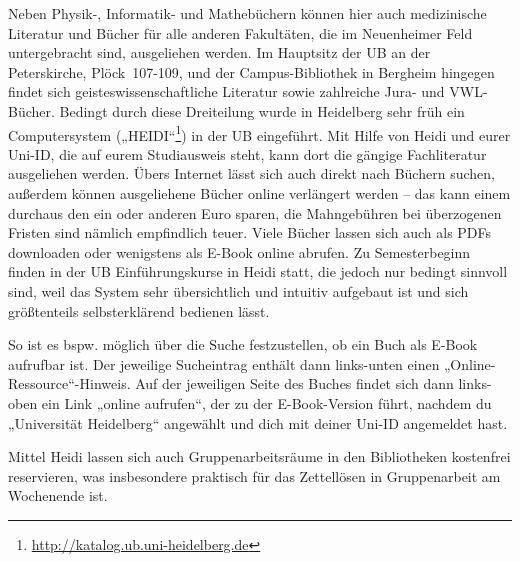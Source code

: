 Neben Physik-, Informatik- und Mathebüchern können hier auch medizinische Literatur und Bücher für alle anderen Fakultäten, die im Neuenheimer Feld untergebracht sind, ausgeliehen werden. Im Hauptsitz der \gls{UB} an der Peterskirche, Plöck~107-109, und der Campus-Bibliothek in Bergheim hingegen findet sich geisteswissenschaftliche Literatur sowie zahlreiche Jura- und VWL- Bücher. Bedingt durch diese Dreiteilung wurde in Heidelberg sehr früh ein Computersystem („\gls{HEIDI}“\footnote{\url{http://katalog.ub.uni-heidelberg.de}}) in der UB eingeführt. Mit Hilfe von Heidi und eurer Uni-ID, die auf eurem Studiausweis steht, kann dort die gängige Fachliteratur ausgeliehen werden. Übers Internet lässt sich auch direkt nach Büchern suchen, außerdem können ausgeliehene Bücher online verlängert werden -- das kann einem durchaus den ein oder anderen Euro sparen, die Mahngebühren bei überzogenen Fristen sind nämlich empfindlich teuer. Viele Bücher lassen sich auch als PDFs downloaden oder wenigstens als E-Book online abrufen. Zu Semesterbeginn finden in der UB Einführungskurse in Heidi statt, die jedoch nur bedingt sinnvoll sind, weil das System sehr übersichtlich und intuitiv aufgebaut ist und sich größtenteils selbsterklärend bedienen lässt.

So ist es bspw. möglich über die Suche festzustellen, ob ein Buch als E-Book aufrufbar ist. Der jeweilige Sucheintrag enthält dann links-unten einen „Online-Ressource“-Hinweis. Auf der jeweiligen Seite des Buches findet sich dann links-oben ein Link „online aufrufen“, der zu der E-Book-Version führt, nachdem du „Universität Heidelberg“ angewählt und dich mit deiner Uni-ID angemeldet hast. 

Mittel Heidi lassen sich auch Gruppenarbeitsräume in den Bibliotheken kostenfrei reservieren, was insbesondere praktisch für das Zettellösen in Gruppenarbeit am Wochenende ist.

